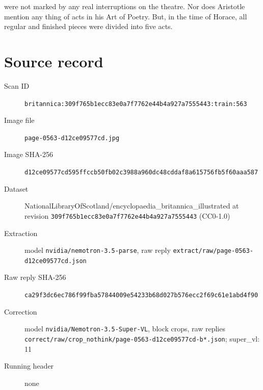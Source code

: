 \documentclass{article}
\begin{document}
were not marked by any real interruptions on the theatre. Nor does Aristotle mention any thing of acts in his Art of Poetry. But, in the time of Horace, all regular and finished pieces were divided into five acts.


\section*{Source record}
\begin{description}
\item[Scan ID] \texttt{britannica:309f765b1ecc83e0a7f7762e44b4a927a7555443:train:563}
\item[Image file] \texttt{page-0563-d12ce09577cd.jpg}
\item[Image SHA-256] \texttt{d12ce09577cd595ffccb50fb02c3988a960dc48cddaf8a615756fb5f60aaa587}
\item[Dataset] NationalLibraryOfScotland/encyclopaedia\_britannica\_illustrated at revision \texttt{309f765b1ecc83e0a7f7762e44b4a927a7555443} (CC0-1.0)
\item[Extraction] model \texttt{nvidia/nemotron-3.5-parse}, raw reply \texttt{extract/raw/page-0563-d12ce09577cd.json}
\item[Raw reply SHA-256] \texttt{ca29f3dc6ec786f99fba57844009e54233b68d027b576ecc2f69c61e1abd4f90}
\item[Correction] model \texttt{nvidia/Nemotron-3.5-Super-VL}, block crops, raw replies \texttt{correct/raw/crop\_nothink/page-0563-d12ce09577cd-b*.json}; super\_vl: 11
\item[Running header] none
\end{description}
\end{document}

